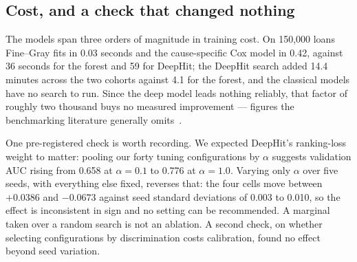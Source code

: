 \documentclass[11pt,journal]{IEEEtran}
\begin{document}
\subsection{Cost, and a check that changed nothing}
\label{sec:cost}
The models span three orders of magnitude in training cost. On 150{,}000 loans
Fine--Gray fits in 0.03 seconds and the cause-specific Cox model in 0.42, against
36 seconds for the forest and 59 for DeepHit; the DeepHit search added 14.4
minutes across the two cohorts against 4.1 for the forest, and the classical
models have no search to run. Since the deep model leads nothing reliably, that
factor of roughly two thousand buys no measured improvement --- figures the
benchmarking literature generally omits~\cite{wiegrebe2024deep}.

One pre-registered check is worth recording. We expected DeepHit's ranking-loss
weight to matter: pooling our forty tuning configurations by $\alpha$ suggests
validation AUC rising from 0.658 at $\alpha=0.1$ to 0.776 at $\alpha=1.0$.
Varying only $\alpha$ over five seeds, with everything else fixed, reverses
that: the four cells move between $+0.0386$ and $-0.0673$ against seed standard
deviations of 0.003 to 0.010, so the effect is inconsistent in sign and no
setting can be recommended. A marginal taken over a random search is not an
ablation. A second check, on whether selecting configurations by discrimination
costs calibration, found no effect beyond seed variation.
\end{document}

